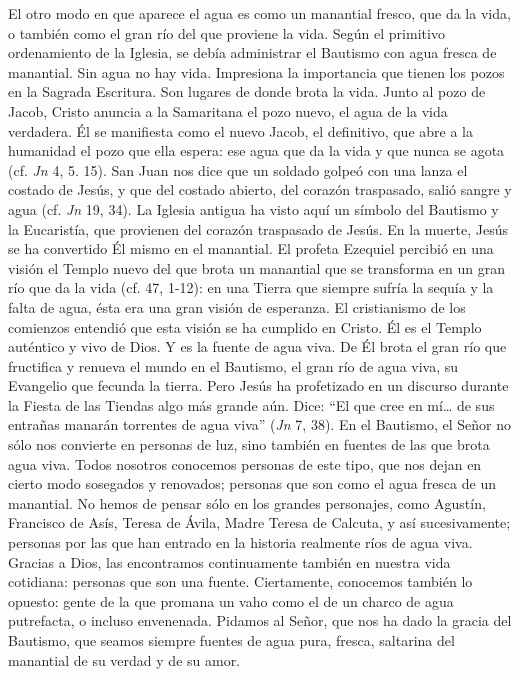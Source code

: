 			\begin{body}El otro modo en que aparece el agua es como un manantial fresco, que da la vida, o también como el gran río del que proviene la vida. Según el primitivo ordenamiento de la Iglesia, se debía administrar el Bautismo con agua fresca de manantial. Sin agua no hay vida. Impresiona la importancia que tienen los pozos en la Sagrada Escritura. Son lugares de donde brota la vida. Junto al pozo de Jacob, Cristo anuncia a la Samaritana el pozo nuevo, el agua de la vida verdadera. Él se manifiesta como el nuevo Jacob, el definitivo, que abre a la humanidad el pozo que ella espera: ese agua que da la vida y que nunca se agota (cf. \textit{Jn} 4, 5. 15). San Juan nos dice que un soldado golpeó con una lanza el costado de Jesús, y que del costado abierto, del corazón traspasado, salió sangre y agua (cf. \textit{Jn} 19, 34). La Iglesia antigua ha visto aquí un símbolo del Bautismo y la Eucaristía, que provienen del corazón traspasado de Jesús. En la muerte, Jesús se ha convertido Él mismo en el manantial. El profeta Ezequiel percibió en una visión el Templo nuevo del que brota un manantial que se transforma en un gran río que da la vida (cf. 47, 1-12): en una Tierra que siempre sufría la sequía y la falta de agua, ésta era una gran visión de esperanza. El cristianismo de los comienzos entendió que esta visión se ha cumplido en Cristo. Él es el Templo auténtico y vivo de Dios. Y es la fuente de agua viva. De Él brota el gran río que fructifica y renueva el mundo en el Bautismo, el gran río de agua viva, su Evangelio que fecunda la tierra. Pero Jesús ha profetizado en un discurso durante la Fiesta de las Tiendas algo más grande aún. Dice: “El que cree en mí… de sus entrañas manarán torrentes de agua viva” (\textit{Jn} 7, 38). En el Bautismo, el Señor no sólo nos convierte en personas de luz, sino también en fuentes de las que brota agua viva. Todos nosotros conocemos personas de este tipo, que nos dejan en cierto modo sosegados y renovados; personas que son como el agua fresca de un manantial. No hemos de pensar sólo en los grandes personajes, como Agustín, Francisco de Asís, Teresa de Ávila, Madre Teresa de Calcuta, y así sucesivamente; personas por las que han entrado en la historia realmente ríos de agua viva. Gracias a Dios, las encontramos continuamente también en nuestra vida cotidiana: personas que son una fuente. Ciertamente, conocemos también lo opuesto: gente de la que promana un vaho como el de un charco de agua putrefacta, o incluso envenenada. Pidamos al Señor, que nos ha dado la gracia del Bautismo, que seamos siempre fuentes de agua pura, fresca, saltarina del manantial de su verdad y de su amor.\end{body}
			
